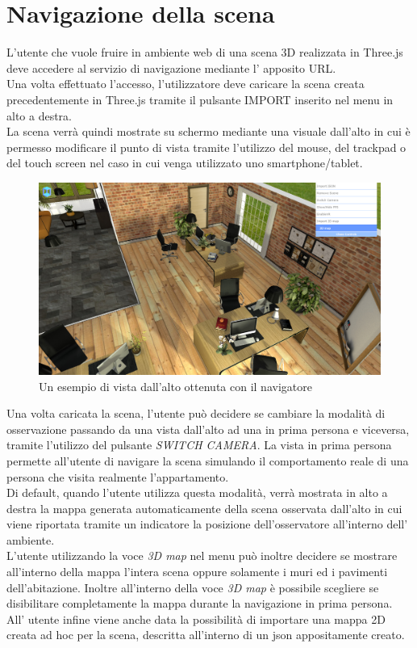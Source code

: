 \section{Navigazione della scena}
\label{sec:chapter_caso_uso_navigazione_scena}

L’utente che vuole fruire in ambiente web di una scena 3D realizzata in Three.js deve accedere al servizio di navigazione mediante l’ apposito URL. 
\\
Una volta effettuato l’accesso, l’utilizzatore deve caricare la scena creata precedentemente in Three.js tramite il pulsante IMPORT inserito nel menu in alto a destra.
\\
La scena verrà quindi mostrate su schermo mediante una visuale dall’alto in cui è permesso modificare il punto di vista tramite l’utilizzo del mouse, del trackpad o  del touch screen nel caso in cui venga utilizzato uno smartphone/tablet.
\\
\begin{figure}[htb]
 \centering
 \includegraphics[width=1\linewidth]{images/chapter_caso_uso/vista_alto.png}\hfill
 \caption[Esempio di vista dall'alto]{Un esempio di vista dall'alto ottenuta con il navigatore}
 \label{fig:caso_uso_vista_alto}
\end{figure}

Una volta caricata la scena, l’utente può decidere se cambiare la modalità di osservazione passando da una vista dall’alto ad una in prima persona e viceversa, tramite l’utilizzo del pulsante \emph{SWITCH CAMERA}.
La vista in prima persona permette all’utente di navigare la scena simulando il comportamento  reale di una persona che visita realmente l’appartamento.
\\
Di default, quando l’utente utilizza questa modalità, verrà mostrata in alto a destra la mappa generata automaticamente della scena osservata  dall’alto in cui viene riportata tramite un indicatore la posizione dell’osservatore all’interno dell’ ambiente.
\\
L’utente utilizzando la voce \emph{3D map} nel menu può inoltre decidere se mostrare all’interno della mappa l’intera scena oppure solamente i muri ed i pavimenti dell’abitazione.
Inoltre all’interno della voce \emph{3D map} è possibile scegliere se disibilitare completamente la mappa durante la navigazione in prima persona.
\\
All’ utente infine viene anche data la possibilità di importare una mappa 2D creata ad hoc per la scena, descritta all’interno di un json appositamente creato.

